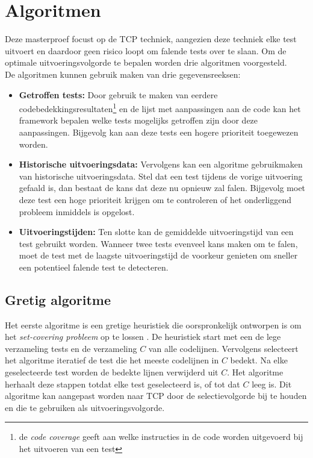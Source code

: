 \section{Algoritmen}
\noindent Deze masterproef focust op de TCP techniek, aangezien deze techniek elke test uitvoert en daardoor geen risico loopt om falende tests over te slaan. Om de optimale uitvoeringsvolgorde te bepalen worden drie algoritmen voorgesteld.\\

\noindent De algoritmen kunnen gebruik maken van drie gegevensreeksen:\\

\begin{itemize}
\item \textbf{Getroffen tests:} Door gebruik te maken van eerdere codebedekkingsresultaten\footnote{de \emph{code coverage} geeft aan welke instructies in de code worden uitgevoerd bij het uitvoeren van een test} en de lijst met aanpassingen aan de code kan het framework bepalen welke tests mogelijks getroffen zijn door deze aanpassingen. Bijgevolg kan aan deze tests een hogere prioriteit toegewezen worden.

\item \textbf{Historische uitvoeringsdata:} Vervolgens kan een algoritme gebruikmaken van historische uitvoeringsdata. Stel dat een test tijdens de vorige uitvoering gefaald is, dan bestaat de kans dat deze nu opnieuw zal falen. Bijgevolg moet deze test een hoge prioriteit krijgen om te controleren of het onderliggend probleem inmiddels is opgelost.

\item \textbf{Uitvoeringstijden:} Ten slotte kan de gemiddelde uitvoeringstijd van een test gebruikt worden. Wanneer twee tests evenveel kans maken om te falen, moet de test met de laagste uitvoeringstijd de voorkeur genieten om sneller een potentieel falende test te detecteren.
\end{itemize}

\subsection{Gretig algoritme}
\noindent Het eerste algoritme is een gretige heuristiek die oorspronkelijk ontworpen is om het \emph{set-covering probleem} op te lossen \cite{evaluationoftestsuiteminimization}. De heuristiek start met een de lege verzameling tests en de verzameling $C$ van alle codelijnen. Vervolgens selecteert het algoritme iteratief de test die het meeste codelijnen in $C$ bedekt. Na elke geselecteerde test worden de bedekte lijnen verwijderd uit $C$. Het algoritme herhaalt deze stappen totdat elke test geselecteerd is, of tot dat $C$ leeg is. 
Dit algoritme kan aangepast worden naar TCP door de selectievolgorde bij te houden en die te gebruiken als uitvoeringsvolgorde.


